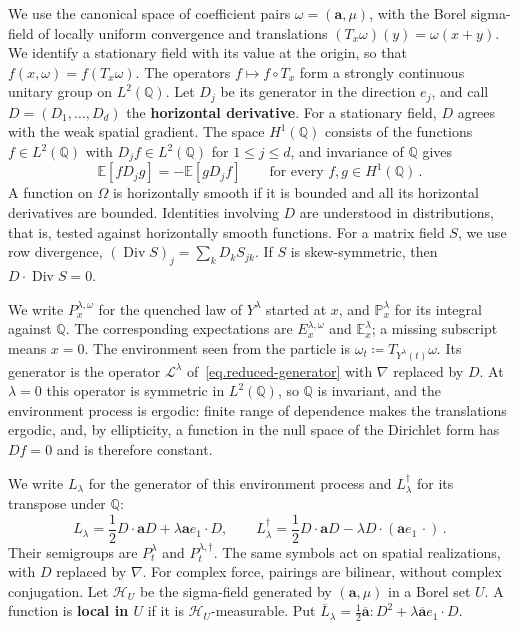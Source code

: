 \documentclass[11pt]{amsart}
\theoremstyle{definition}
\theoremstyle{remark}
\numberwithin{equation}{section}
\newcommand{\E}{\mathbb E}
\newcommand{\Q}{\mathbb Q}
\renewcommand{\a}{\mathbf a}
\newcommand{\ahom}{\overline{\mathbf a}}
\newcommand{\Div}{\operatorname{Div}}
\begin{document}
We use the canonical space of coefficient pairs $\omega=(\a,\mu)$, with the Borel sigma-field of locally uniform convergence and translations $(T_x\omega)(y)=\omega(x+y)$. We identify a stationary field with its value at the origin, so that $f(x,\omega)=f(T_x\omega)$. The operators $f\mapsto f\circ T_x$ form a strongly continuous unitary group on $L^2(\Q)$. Let $D_j$ be its generator in the direction $e_j$, and call $D=(D_1,\ldots,D_d)$ the \textbf{horizontal derivative}. For a stationary field, $D$ agrees with the weak spatial gradient. The space $H^1(\Q)$ consists of the functions $f\in L^2(\Q)$ with $D_jf\in L^2(\Q)$ for $1\leq j\leq d$, and invariance of $\Q$ gives
\begin{equation}\label{eq.horizontal-ibp}
 \E[fD_jg]=-\E[gD_jf]\qquad\text{for every }f,g\in H^1(\Q)\, .
\end{equation}
A function on $\Omega$ is horizontally smooth if it is bounded and all its horizontal derivatives are bounded. Identities involving $D$ are understood in distributions, that is, tested against horizontally smooth functions. For a matrix field $S$, we use row divergence, $(\Div S)_j=\sum_kD_kS_{jk}$. If $S$ is skew-symmetric, then $D\cdot\Div S=0$.

We write $P_x^{\lambda,\omega}$ for the quenched law of $Y^\lambda$ started at $x$, and $\mathbb P_x^\lambda$ for its integral against $\Q$. The corresponding expectations are $E_x^{\lambda,\omega}$ and $\mathbb E_x^\lambda$; a missing subscript means $x=0$. The environment seen from the particle is $\omega_t\coloneqq T_{Y^\lambda(t)}\omega$. Its generator is the operator $\mathcal L^\lambda$ of~\eqref{eq.reduced-generator} with $\nabla$ replaced by $D$. At $\lambda=0$ this operator is symmetric in $L^2(\Q)$, so $\Q$ is invariant, and the environment process is ergodic: finite range of dependence makes the translations ergodic, and, by ellipticity, a function in the null space of the Dirichlet form has $Df=0$ and is therefore constant.


We write $L_\lambda$ for the generator of this environment process and $L_\lambda^\dagger$ for its transpose under $\Q$:
\begin{equation}\label{e:generators}
 L_\lambda=\frac12D\cdot\a D+\lambda\a e_1\cdot D,
 \qquad L_\lambda^\dagger=\frac12D\cdot\a D-\lambda D\cdot(\a e_1\,\cdot)\, .
\end{equation}
Their semigroups are $P_t^\lambda$ and $P_t^{\lambda,\dagger}$. The same symbols act on spatial realizations, with $D$ replaced by $\nabla$. For complex force, pairings are bilinear, without complex conjugation. Let $\mathcal H_U$ be the sigma-field generated by $(\a,\mu)$ in a Borel set $U$. A function is \textbf{local in $U$} if it is $\mathcal H_U$-measurable. Put $\overline L_\lambda=\frac12\ahom:D^2+\lambda\ahom e_1\cdot D$.
\end{document}
